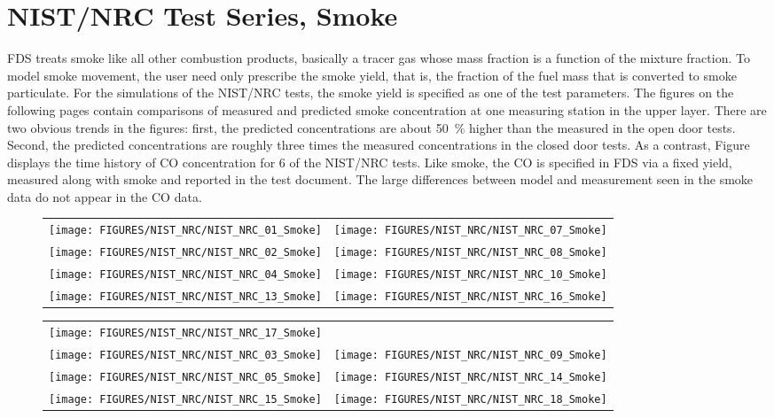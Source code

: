 \section{NIST/NRC Test Series, Smoke}

FDS treats smoke like all other combustion products, basically a tracer gas whose mass fraction is a function of the mixture fraction.
To model smoke movement, the user need only prescribe the smoke yield, that is, the fraction of the fuel mass that is
converted to smoke particulate.  For the simulations of the NIST/NRC tests, the smoke yield is specified as one of the test parameters.
The figures on the following pages contain comparisons of measured and predicted smoke concentration at one measuring station in the upper layer.
There are two obvious trends in the figures: first, the predicted concentrations are about 50~\% higher than the measured
in the open door tests.  Second,
the predicted concentrations are roughly three times the measured concentrations in the closed door tests.
As a contrast, Figure displays the time history of CO concentration for 6 of the NIST/NRC tests.
Like smoke, the CO is specified in FDS via a fixed yield, measured along with smoke and reported in the test document.
The large differences between model and measurement seen in the smoke data do not appear in the CO data.

\newpage

\begin{figure}[p]
\begin{tabular*}{\textwidth}{l@{\extracolsep{\fill}}r}
\texttt{[image: FIGURES/NIST\_NRC/NIST\_NRC\_01\_Smoke]} &
\texttt{[image: FIGURES/NIST\_NRC/NIST\_NRC\_07\_Smoke]} \\
\texttt{[image: FIGURES/NIST\_NRC/NIST\_NRC\_02\_Smoke]} &
\texttt{[image: FIGURES/NIST\_NRC/NIST\_NRC\_08\_Smoke]} \\
\texttt{[image: FIGURES/NIST\_NRC/NIST\_NRC\_04\_Smoke]} &
\texttt{[image: FIGURES/NIST\_NRC/NIST\_NRC\_10\_Smoke]} \\
\texttt{[image: FIGURES/NIST\_NRC/NIST\_NRC\_13\_Smoke]} &
\texttt{[image: FIGURES/NIST\_NRC/NIST\_NRC\_16\_Smoke]}
\end{tabular*}
\end{figure}

\begin{figure}[p]
\begin{tabular*}{\textwidth}{l@{\extracolsep{\fill}}r}
\texttt{[image: FIGURES/NIST\_NRC/NIST\_NRC\_17\_Smoke]} &
 \\
\texttt{[image: FIGURES/NIST\_NRC/NIST\_NRC\_03\_Smoke]} &
\texttt{[image: FIGURES/NIST\_NRC/NIST\_NRC\_09\_Smoke]} \\
\texttt{[image: FIGURES/NIST\_NRC/NIST\_NRC\_05\_Smoke]} &
\texttt{[image: FIGURES/NIST\_NRC/NIST\_NRC\_14\_Smoke]} \\
\texttt{[image: FIGURES/NIST\_NRC/NIST\_NRC\_15\_Smoke]} &
\texttt{[image: FIGURES/NIST\_NRC/NIST\_NRC\_18\_Smoke]}
\end{tabular*}
\end{figure}



